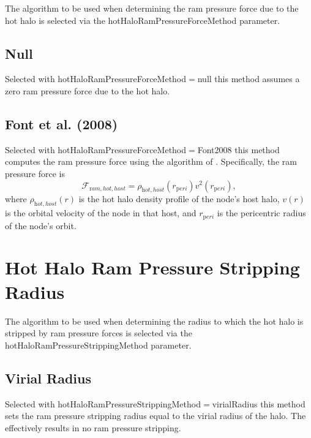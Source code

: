 The algorithm to be used when determining the ram pressure force due to the hot halo is selected via the {\normalfont \ttfamily hotHaloRamPressureForceMethod} parameter.

\subsection{Null}

Selected with {\normalfont \ttfamily hotHaloRamPressureForceMethod}$=${\normalfont \ttfamily null} this method assumes a zero ram pressure force due to the hot halo.

\subsection{Font et al. (2008)}

Selected with {\normalfont \ttfamily hotHaloRamPressureForceMethod}$=${\normalfont \ttfamily Font2008} this method computes the ram pressure force using the algorithm of \cite{font_colours_2008}. Specifically, the ram pressure force is
\begin{equation}
\mathcal{F}_{\mathrm ram, hot, host} = \rho_{\mathrm hot, host}(r_{\mathrm peri}) v^2(r_{\mathrm peri}),
\end{equation}
where $\rho_{\mathrm hot, host}(r)$ is the hot halo density profile of the node's host halo, $v(r)$ is the orbital velocity of the node in that host, and $r_{\mathrm peri}$ is the pericentric radius of the node's orbit.

\section{Hot Halo Ram Pressure Stripping Radius}\label{sec:HotHaloRamPressureStrip}

The algorithm to be used when determining the radius to which the hot halo is stripped by ram pressure forces is selected via the {\normalfont \ttfamily hotHaloRamPressureStrippingMethod} parameter.

\subsection{Virial Radius}

Selected with {\normalfont \ttfamily hotHaloRamPressureStrippingMethod}$=${\normalfont \ttfamily virialRadius} this method sets the ram pressure stripping radius equal to the virial radius of the halo. The effectively results in no ram pressure stripping.

